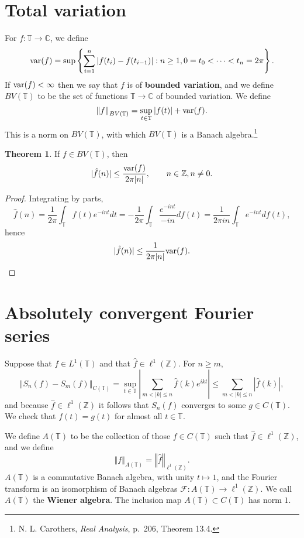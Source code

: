 \documentclass{article}
\newcommand{\var}{\ensuremath\mathrm{var}}
\newcommand{\norm}[1]{\left\Vert #1 \right\Vert}
\theoremstyle{definition}
\newtheorem{theorem}{Theorem}
\theoremstyle{definition}
\begin{document}
\section{Total variation}
For $f:\mathbb{T} \to \mathbb{C}$, we define
\[
\var(f) = \sup \left\{ \sum_{i=1}^n |f(t_i)-f(t_{i-1})|:
n \geq 1, 0=t_0<\cdots<t_n=2\pi \right\}.
\]
If $\var(f)<\infty$ then we say that $f$ is of \textbf{bounded variation}, and we define $BV(\mathbb{T})$ to be the set of functions
$\mathbb{T} \to \mathbb{C}$ of bounded variation. We define
\[
\norm{f}_{BV(\mathbb{T})} =\sup_{t \in \mathbb{T}} |f(t)|+\var(f).
\]
This is a norm on $BV(\mathbb{T})$, with which $BV(\mathbb{T})$ is a Banach algebra.\footnote{N. L. Carothers, {\em Real Analysis},
p.~206, Theorem 13.4.}

\begin{theorem}
If $f \in BV(\mathbb{T})$, then 
\[
|\hat{f}(n)| \leq \frac{\var(f)}{2\pi|n|}, \qquad n \in \mathbb{Z}, n \neq 0.
\]
\end{theorem}
\begin{proof}
Integrating by parts,
\[
\hat{f}(n)=\frac{1}{2\pi} \int_{\mathbb{T}} f(t) e^{-int} dt
=- \frac{1}{2\pi} \int_{\mathbb{T}} \frac{e^{-int}}{-in} df(t)
=\frac{1}{2\pi in} \int_{\mathbb{T}} e^{-int} df(t),
\]
hence
\[
|\hat{f}(n)| \leq \frac{1}{2\pi |n|} \var(f).
\]
\end{proof}


\section{Absolutely convergent Fourier series}
Suppose that $f \in L^1(\mathbb{T})$ and that $\hat{f} \in \ell^1(\mathbb{Z})$.
For $n \geq m$,
\[
\norm{S_n(f)-S_m(f)}_{C(\mathbb{T})} = 
\sup_{t \in \mathbb{T}} \left| \sum_{m < |k| \leq n} \hat{f}(k) e^{ikt} \right|
\leq \sum_{m < |k| \leq n} |\hat{f}(k)|,
\]
and because $\hat{f} \in \ell^1(\mathbb{Z})$ it follows that $S_n(f)$ converges to some 
$g \in C(\mathbb{T})$.
We check that $f(t)=g(t)$ for almost all $t \in \mathbb{T}$.

We define $A(\mathbb{T})$ to be the collection of those $f \in C(\mathbb{T})$ such that
$\hat{f} \in \ell^1(\mathbb{Z})$, and we define
\[
\norm{f}_{A(\mathbb{T})} = \norm{\hat{f}}_{\ell^1(\mathbb{Z})}.
\]
$A(\mathbb{T})$ is a commutative Banach algebra, with unity $t \mapsto 1$, and
the Fourier transform is an isomorphism of Banach algebras
$\mathscr{F}:A(\mathbb{T}) \to \ell^1(\mathbb{Z})$. 
We call $A(\mathbb{T})$ the \textbf{Wiener algebra}. The inclusion map $A(\mathbb{T}) \subset C(\mathbb{T})$
has  norm $1$. 
\end{document}
